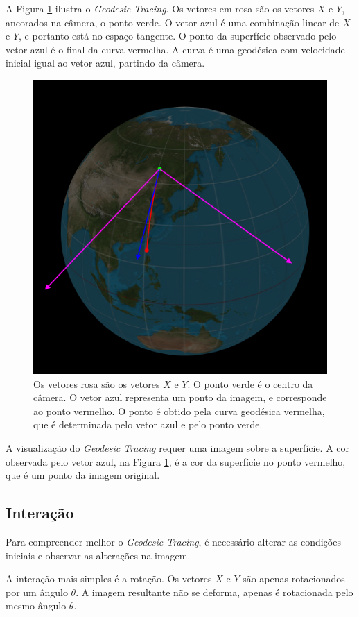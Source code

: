 A Figura \ref{img:geotracing} ilustra o \textit{Geodesic Tracing}.
Os vetores em rosa são os vetores $X$ e $Y$, ancorados na câmera, o ponto verde.
O vetor azul é uma combinação linear de $X$ e $Y$, e portanto está no espaço tangente.
O ponto da superfície observado pelo vetor azul é o final da curva vermelha.
A curva é uma geodésica com velocidade inicial igual ao vetor azul, partindo da câmera.

\begin{figure}[!ht]
    \centering
    \includegraphics[width=0.6\linewidth]{geotracing.png}
    \caption[Ilustração do \textit{Geodesic Tracing}]{
    Os vetores rosa são os vetores $X$ e $Y$.
    O ponto verde é o centro da câmera. O vetor azul representa um ponto
    da imagem, e corresponde ao ponto vermelho. O ponto é obtido pela curva geodésica
    vermelha, que é determinada pelo vetor azul e pelo ponto verde.}
    \label{img:geotracing}
\end{figure}

A visualização do \textit{Geodesic Tracing} requer uma imagem sobre a superfície.
A cor observada pelo vetor azul, na Figura \ref{img:geotracing}, é a cor da superfície
no ponto vermelho, que é um ponto da imagem original.

\subsection{Interação}
Para compreender melhor o \textit{Geodesic Tracing},
é necessário alterar as condições iniciais e observar as alterações na imagem.

A interação mais simples é a rotação.
Os vetores $X$ e $Y$ são apenas rotacionados por um ângulo $\theta$.
A imagem resultante não se deforma, apenas é rotacionada pelo mesmo ângulo $\theta$.

